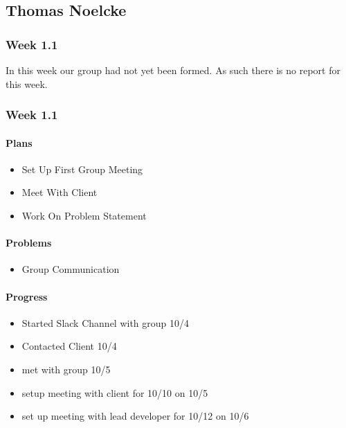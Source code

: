 \documentclass[onecolumn, draftclsnofoot,10pt, compsoc]{article}
\begin{document}
    \subsection{Thomas Noelcke}

        \subsubsection {Week 1.1}
        In this week our group had not yet been formed. As such there is no report for this week.
    \subsubsection{Week 1.1}

		    \paragraph{Plans} \hfill \break

		    \begin{itemize}
		        \item Set Up First Group Meeting
		        \item Meet With Client
		        \item Work On Problem Statement
		    \end{itemize}

		    \paragraph{Problems} \hfill \break

		    \begin{itemize}
		        \item Group Communication
		    \end{itemize}

		    \paragraph{Progress} \hfill \break
		    \begin{itemize}
		        \item Started Slack Channel with group 10/4
		        \item Contacted Client 10/4
		        \item met with group 10/5
		        \item setup meeting with client for 10/10 on 10/5
		        \item set up meeting with lead developer for 10/12 on 10/6
		    \end{itemize}
\end{document}
